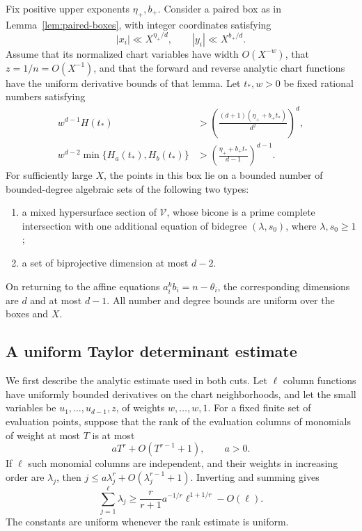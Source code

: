 \begin{proposition}\label{prop:archimedean-cuts}
Fix positive upper exponents $\eta_+,b_+$.  Consider a paired box
as in Lemma~\ref{lem:paired-boxes}, with
integer coordinates satisfying
\[
 |x_i|\ll X^{\eta_+/d},\qquad |y_i|\ll X^{b_+/d}.
\]
Assume that its normalized chart variables have width \(O(X^{-w})\),
that \(z=1/n=O(X^{-1})\), and that the forward and reverse analytic
chart functions have the uniform derivative bounds of that lemma.
Let \(t_*,w>0\) be fixed rational numbers satisfying
\begin{equation}
 \begin{split}
 w^{d-1}H(t_*)&>
 \left(\frac{(d+1)(\eta_++b_+t_*)}{d^2}\right)^d,\\
 w^{d-2}\min\{H_a(t_*),H_b(t_*)\}&>
 \left(\frac{\eta_++b_+t_*}{d-1}\right)^{d-1}.
 \end{split}
 \label{eq:cut-conditions}
\end{equation}
For sufficiently large \(X\), the points in this box lie on a bounded
number of bounded-degree algebraic sets of the following two types:
\begin{enumerate}
\item a mixed hypersurface section of \(\mathcal V\), whose bicone is
a prime complete intersection with one additional equation of
bidegree \((\lambda,s_0)\), where \(\lambda,s_0\geq1\);
\item a set of biprojective dimension at most \(d-2\).
\end{enumerate}
On returning to the affine equations \(a_i^kb_i=n-\theta_i\), the
corresponding dimensions are \(d\) and at most \(d-1\).
All number and degree bounds are uniform over the boxes and \(X\).
\end{proposition}

\subsection{A uniform Taylor determinant estimate}

We first describe the analytic estimate used in both cuts.
Let \(\ell\) column functions have uniformly bounded derivatives on
the chart neighborhoods, and let the small variables be
\(u_1,\ldots,u_{d-1},z\), of weights \(w,\ldots,w,1\).
For a fixed finite set of evaluation points, suppose that the rank
of the evaluation columns of monomials of weight at most \(T\) is
at most
\[
 aT^r+O(T^{r-1}+1),\qquad a>0.
\]
If \(\ell\) such monomial columns are independent, and their
weights in increasing order are \(\lambda_j\), then
\(j\leq a\lambda_j^r+O(\lambda_j^{r-1}+1)\).  Inverting and summing
gives
\begin{equation}
 \sum_{j=1}^{\ell}\lambda_j
 \geq \frac{r}{r+1}a^{-1/r}\ell^{1+1/r}-O(\ell).
 \label{eq:taylor-rank-weights}
\end{equation}
The constants are uniform whenever the rank estimate is uniform.


